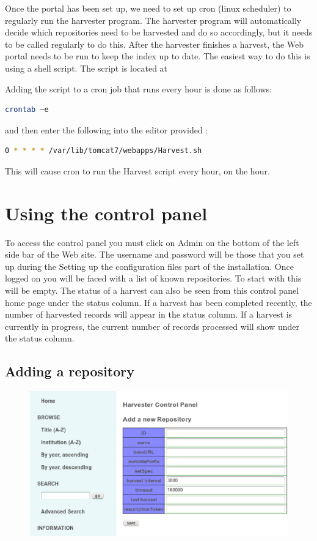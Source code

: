 \documentclass[a4paper,11pt]{article}
\begin{document}
Once the portal has been set up, we need to set up cron (linux scheduler) to regularly run the harvester program. The harvester program will automatically decide which repositories need to be harvested and do so accordingly, but it needs to be called regularly to do this. After the harvester finishes a harvest, the Web portal needs to be run to keep the index up to date. The easiest way to do this is using a shell script. The script is located at 

Adding the script to a cron job that runs every hour is done as follows: 

\begin{lstlisting}[language=bash]
 crontab –e
\end{lstlisting}

and then enter the following into the editor provided : 

\begin{lstlisting}[language=bash]
 0 * * * * /var/lib/tomcat7/webapps/Harvest.sh
\end{lstlisting}

This will cause cron to run the Harvest script every hour, on the hour.

\section{Using the control panel}

To access the control panel you must click on Admin on the bottom of the left side bar of the Web site. The username and password will be those that you set up during the Setting up the configuration files part of the installation. Once logged on you will be faced with a list of known repositories. To start with this will be empty. The status of a harvest can also be seen from this control panel home page under the status column. If a harvest has been completed recently, the number of harvested records will appear in the status column. If a harvest is currently in progress, the current number of records processed will show under the status column.

\subsection{Adding a repository}

\begin{figure}
 \centering
 \includegraphics[width=\textwidth]{adding_repository_infomation_x.eps}
\end{figure}
\end{document}

